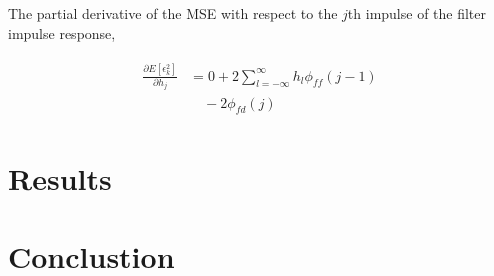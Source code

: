 \documentclass[8pt,a4paper]{article}
\begin{document}
\begin{multicols}{2}
The partial derivative of the MSE with respect to the $j$th impulse of the filter impulse response, 

\begin{align}
  \begin{split}
  \frac{ \partial E \left[ \epsilon_{k}^{2} \right]  }{ \partial h_{j} } &= 0 + 2 \sum_{l=-\infty}^{\infty} h_{l} \phi_{ff}(j-1) \\
  &\quad -2 \phi_{fd}(j)
  \end{split}
\end{align}




\section*{Results}


\section*{Conclustion}

 \label{sec:references}
\newpage


\end{multicols}
\end{document}
